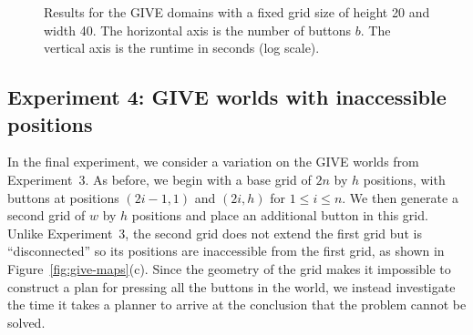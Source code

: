 \begin{figure}[t]
  \caption{Results for the GIVE domains with a fixed grid size of
  height 20 and width 40. The horizontal axis is the number of buttons $b$.
  The vertical axis is the runtime in seconds (log scale).}
  \label{fig:give-buttons}
\end{figure}

\subsection{Experiment 4: GIVE worlds with inaccessible positions}
\label{sec:experiment-4:-give}

In the final experiment, we consider a variation on the GIVE worlds from
Experiment~3. As before, we begin with a base grid of $2n$ by $h$
positions, with buttons at positions $(2i-1,1)$ and $(2i,h)$ for $1 \leq i
\leq n$. We then generate a second grid of $w$ by $h$ positions and place
an additional button in this grid. Unlike Experiment~3, the second grid
does not extend the first grid but is ``disconnected'' so its positions are
inaccessible from the first grid, as shown in
Figure~\ref{fig:give-maps}(c). Since the geometry of the grid makes it
impossible to construct a plan for pressing all the buttons in the world,
we instead investigate the time it takes a planner to arrive at the
conclusion that the problem cannot be solved.

